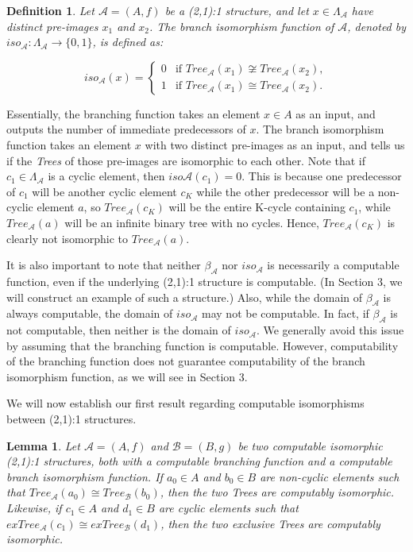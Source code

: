 \documentclass[12pt]{article}
\newtheorem{dfn}[thm]{Definition}
\newtheorem{lemma}[thm]{Lemma}
\begin{document}
\begin{dfn}
Let $\mathcal{A} = (A,f)$ be a (2,1):1 structure, and let $x \in \Lambda_{\mathcal{A}}$ have distinct pre-images $x_1$ and $x_2$. The \emph{branch isomorphism function of $\mathcal{A}$}, denoted by $iso_{\mathcal{A}}: \Lambda_{\mathcal{A}} \to \{0,1\}$, is defined as:

$$iso_{\mathcal{A}}(x)=
		\begin{cases}
			0 &\text{if } Tree_\mathcal{A} (x_1) \not\cong Tree_\mathcal{A} (x_2),\\
			1 &\text{if } Tree_\mathcal{A} (x_1) \cong Tree_\mathcal{A} (x_2).
		\end{cases}$$
\end{dfn}

Essentially, the branching function takes an element $x \in A$ as an input, and outputs the number of immediate predecessors of $x$. The branch isomorphism function takes an element $x$ with two distinct pre-images as an input, and tells us if the \emph{Trees} of those pre-images are isomorphic to each other. Note that if $c_1 \in \Lambda_{\mathcal{A}}$ is a cyclic element, then $iso{\mathcal{A}} (c_1) = 0$. This is because one predecessor of $c_1$ will be another cyclic element $c_K$ while the other predecessor will be a non-cyclic element $a$, so $Tree_\mathcal{A} (c_K)$ will be the entire K-cycle containing $c_1$, while $Tree_\mathcal{A} (a)$ will be an infinite binary tree with no cycles. Hence, $Tree_\mathcal{A} (c_K)$ is clearly not isomorphic to $Tree_\mathcal{A} (a)$.

It is also important to note that neither $\beta_{\mathcal{A}}$ nor $iso_{\mathcal{A}}$ is necessarily a computable function, even if the underlying (2,1):1 structure is computable. (In Section 3, we will construct an example of such a structure.) Also, while the domain of $\beta_{\mathcal{A}}$ is always computable, the domain of $iso_{\mathcal{A}}$ may not be computable. In fact, if $\beta_{\mathcal{A}}$ is not computable, then neither is the domain of $iso_{\mathcal{A}}$. We generally avoid this issue by assuming that the branching function is computable. However, computability of the branching function does not guarantee computability of the branch isomorphism function, as we will see in Section 3.

We will now establish our first result regarding computable isomorphisms between (2,1):1 structures.

\begin{lemma}
Let $\mathcal{A} = (A,f)$ and $\mathcal{B} = (B,g)$ be two computable isomorphic (2,1):1 structures, both with a computable branching function and a computable branch isomorphism function. If $a_0 \in A$ and $b_0 \in B$ are non-cyclic elements such that $Tree_\mathcal{A} (a_0) \cong Tree_\mathcal{B} (b_0)$, then the two Trees are computably isomorphic. Likewise, if $c_1 \in A$ and $d_1 \in B$ are cyclic elements such that $exTree_\mathcal{A} (c_1) \cong exTree_\mathcal{B} (d_1)$, then the two exclusive Trees are computably isomorphic.
\end{lemma}
\end{document}
